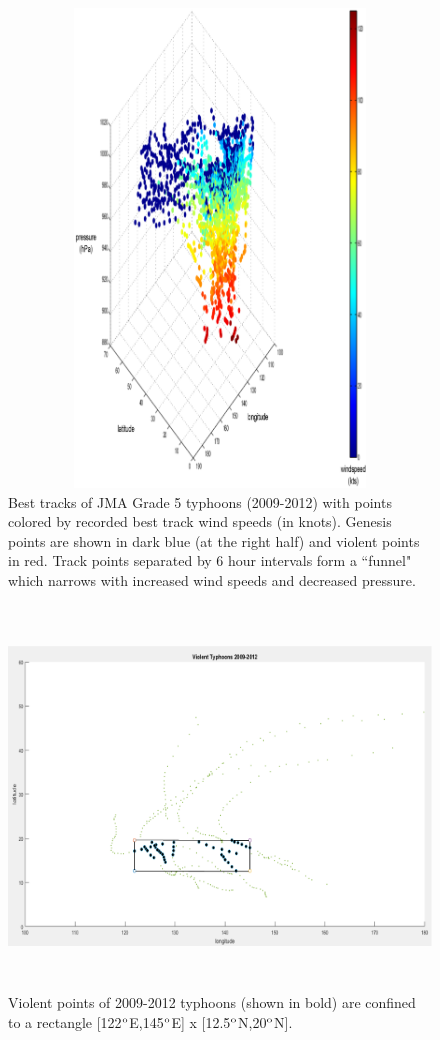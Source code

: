 \documentclass[a4paper, 12pt]{article}
\begin{document}
{\newpage
 \begin{figure}[h]
 \centering
\includegraphics[width=5.75in,height=5in]{violentfig1a.eps}
\caption{Best tracks of JMA Grade 5 typhoons (2009-2012) with points colored by recorded best track wind speeds (in knots). Genesis points are shown in dark blue (at the right half) and violent points in red. Track points separated by 6 hour intervals form a ``funnel" which narrows with increased wind speeds and decreased pressure.}
\label{fig1a}
\end{figure}

\newpage

 \begin{figure}[h]
 \centering
\includegraphics[width=6in,height=4in]{violentfig1.eps}
\caption{Violent points of  2009-2012 typhoons (shown in bold) are confined to a rectangle [122$^{\textup{o}}$E,145$^{\textup{o}}$E] x [12.5$^{\textup{o}}$N,20$^{\textup{o}}$N].}
\label{fig1}
\vspace{2in}
\end{figure}



}
\end{document}

